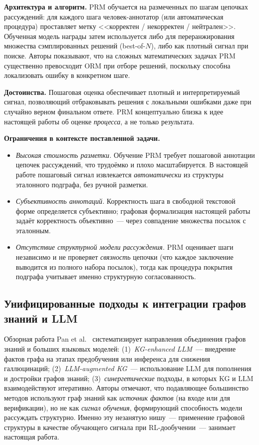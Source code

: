 \textbf{Архитектура и алгоритм.}
PRM обучается на размеченных по шагам цепочках рассуждений: для каждого шага человек-аннотатор (или автоматическая процедура) проставляет метку <<корректен / некорректен / нейтрален>>. Обученная модель награды затем используется либо для переранжирования множества сэмплированных решений (best-of-$N$), либо как плотный сигнал при поиске. Авторы показывают, что на сложных математических задачах PRM существенно превосходит ORM при отборе решений, поскольку способна локализовать ошибку в конкретном шаге.

\textbf{Достоинства.}
Пошаговая оценка обеспечивает плотный и интерпретируемый сигнал, позволяющий отбраковывать решения с локальными ошибками даже при случайно верном финальном ответе. PRM концептуально близка к идее настоящей работы об оценке \emph{процесса}, а не только результата.

\textbf{Ограничения в контексте поставленной задачи.}
\begin{itemize}
    \item \textit{Высокая стоимость разметки.} Обучение PRM требует пошаговой аннотации цепочек рассуждений, что трудоёмко и плохо масштабируется. В настоящей работе пошаговый сигнал извлекается \emph{автоматически} из структуры эталонного подграфа, без ручной разметки.
    \item \textit{Субъективность аннотаций.} Корректность шага в свободной текстовой форме определяется субъективно; графовая формализация настоящей работы задаёт корректность объективно~--- через совпадение множества посылок с эталонным.
    \item \textit{Отсутствие структурной модели рассуждения.} PRM оценивает шаги независимо и не проверяет \emph{связность} цепочки (что каждое заключение выводится из полного набора посылок), тогда как процедура покрытия подграфа учитывает именно структурную согласованность.
\end{itemize}

\subsection{Унифицированные подходы к интеграции графов знаний и LLM}
\label{subsec:kg-llm-survey}

Обзорная работа Pan et al.~\cite{pan2024unifying} систематизирует направления объединения графов знаний и больших языковых моделей: (1)~\textit{KG-enhanced LLM}~--- внедрение фактов графа на этапах предобучения или инференса для снижения галлюцинаций; (2)~\textit{LLM-augmented KG}~--- использование LLM для пополнения и достройки графов знаний; (3)~\textit{синергетические} подходы, в которых KG и LLM взаимодействуют итеративно. Авторы отмечают, что подавляющее большинство методов используют граф знаний как \emph{источник фактов} (на входе или для верификации), но не как \emph{сигнал обучения}, формирующий способность модели рассуждать структурно. Именно эту незанятую нишу~--- применение графовой структуры в качестве обучающего сигнала при RL-дообучении~--- занимает настоящая работа.

